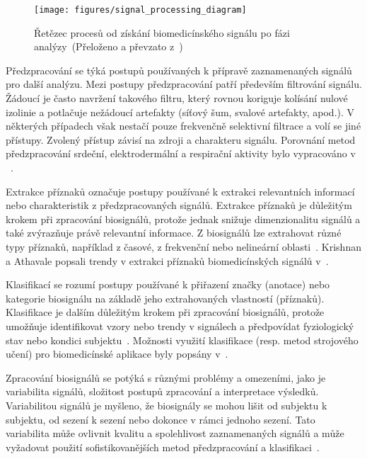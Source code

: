 \begin{figure}[htb!]
    \begin{center}
        \texttt{[image: figures/signal\_processing\_diagram]}
        \caption{Řetězec procesů od získání biomedicínského signálu po fázi
        analýzy~(Přeloženo a převzato z~\cite{Karagiannis2011})}
        \label{fig:zpracovani_biosignalu_diagram}
    \end{center}
\end{figure}

Předzpracování se týká postupů používaných k přípravě zaznamenaných signálů pro
další analýzu. Mezi postupy předzpracování patří především filtrování signálu.
Žádoucí je často navržení takového filtru, který rovnou koriguje kolísání nulové
izolinie a potlačuje nežádoucí artefakty (síťový šum, svalové artefakty, apod.).
V některých případech však nestačí pouze frekvenčně selektivní filtrace a volí
se jiné přístupy. Zvolený přístup závisí na zdroji a charakteru signálu.
Porovnání metod předzpracování srdeční, elektrodermální a respirační aktivity
bylo vypracováno v ~\cite{Escabi2005,Khodadad2018,Power2020,Subramanian2019}. 

Extrakce příznaků označuje postupy používané k extrakci relevantních informací
nebo charakteristik z předzpracovaných signálů. Extrakce příznaků je důležitým
krokem při zpracování biosignálů, protože jednak snižuje dimenzionalitu signálů
a také zvýrazňuje právě relevantní informace. Z biosignálů lze extrahovat různé
typy příznaků, například z časové, z frekvenční nebo nelineární
oblasti~\cite{Escabi2005,Karagiannis2011}. Krishnan a Athavale popsali trendy v
extrakci příznaků biomedicínských signálů v~\cite{Krishnan2018}.

Klasifikací se rozumí postupy používané k přiřazení značky (anotace) nebo
kategorie biosignálu na základě jeho extrahovaných vlastností (příznaků).
Klasifikace je dalším důležitým krokem při zpracování biosignálů, protože
umožňuje identifikovat vzory nebo trendy v signálech a předpovídat fyziologický
stav nebo kondici subjektu~\cite{Escabi2005,Karagiannis2011}. Možnosti využití
klasifikace (resp. metod strojového učení) pro biomedicínské aplikace byly
popsány v~\cite{Foster2014,Kording2018,Strzelecki2022}.

Zpracování biosignálů se potýká s různými problémy a omezeními, jako je
variabilita signálů, složitost postupů zpracování a interpretace výsledků.
Variabilitou signálů je myšleno, že biosignály se mohou lišit od subjektu k
subjektu, od sezení k sezení nebo dokonce v rámci jednoho sezení. Tato
variabilita může ovlivnit kvalitu a spolehlivost zaznamenaných signálů a může
vyžadovat použití sofistikovanějších metod předzpracování a
klasifikaci~\cite{Escabi2005,Karagiannis2011}.